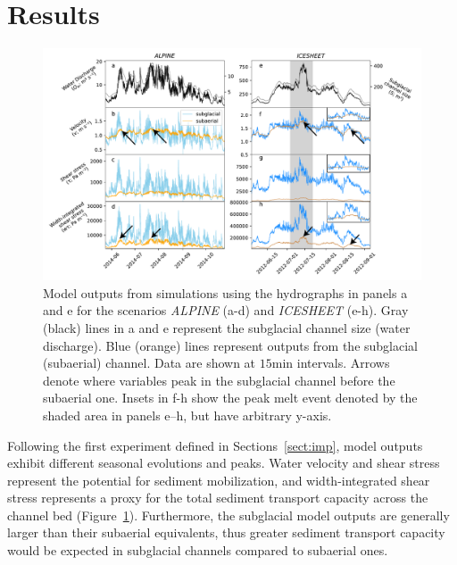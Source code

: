 \documentclass[draft]{agujournal2019}
\newcommand{\alpine}{\textit{ALPINE}}
\newcommand{\icesheet}{\textit{ICESHEET}}
\newcommand{\unit}[1]{$\mathrm{#1}$}
\begin{document}
\section{Results}
\begin{figure}[h]
  \centering
  \includegraphics[width=0.9\linewidth]{Fig2.pdf}
  \caption{Model outputs from simulations using the hydrographs in panels a and e for the scenarios \alpine{} (a-d) and \icesheet{} (e-h).
    Gray (black) lines in a and e represent the subglacial channel size (water discharge).
    Blue (orange) lines represent outputs from the subglacial (subaerial) channel.
    Data are shown at $15$\unit{min} intervals.
    Arrows denote where variables peak in the subglacial channel before the subaerial one.
    Insets in f-h show the  peak melt event denoted by the shaded area in panels e--h, but have arbitrary y-axis.
  }
  \label{fig:model_outs}
\end{figure}

Following the first experiment defined in Sections~\ref{sect:imp}, model outputs exhibit different seasonal evolutions and peaks.
Water velocity and shear stress represent the potential for sediment mobilization, and width-integrated shear stress represents a proxy for the total sediment transport capacity across the channel bed (Figure~\ref{fig:model_outs}).
Furthermore, the subglacial model outputs are generally larger than their subaerial equivalents, thus greater sediment transport capacity would be expected in subglacial channels compared to subaerial ones.
\end{document}
